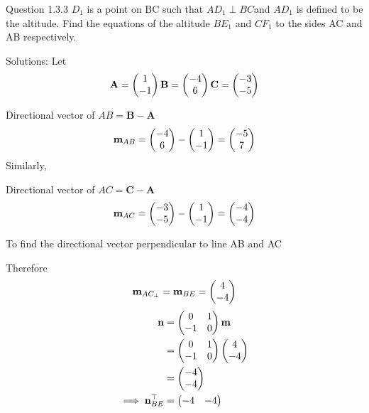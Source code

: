 \documentclass[12pt]{article}
\begin{document}
\let\vec\mathbf

Question 1.3.3 $D_{1}$ is a point on BC such that
$AD_{1}\perp BC$and $AD_{1} $ is defined to be the altitude.
Find the equations of the altitude $BE_{1} $ and $CF_{1}$
to the sides AC and AB respectively.






   
{Solutions}:
Let 
\begin{align}\vec{A}=\myvec{1\\-1\\}
\vec{B}=\myvec{-4 \\6 \\}
\vec{C}=\myvec{-3\\-5\\}
\end{align}


 Directional vector of $AB=\vec{B}-\vec{A}$
\begin{align}
\vec{m}_{AB}=\myvec{-4\\6\\}
-\myvec{1\\-1 \\}
=\myvec{-5\\7\\}
\end{align}
Similarly,


 Directional vector of $AC=\vec{C}-\vec{A}$
\begin{align}
\vec{m}_{AC}=\myvec{-3\\-5\\}
-\myvec{1\\-1\\}
=\myvec{-4\\-4\\}
\end{align}

To find the directional vector perpendicular to line AB and AC


Therefore
\begin{align}
\vec{m}_{AC_{\perp}}=\vec{m}_{BE}=\myvec{4\\-4}
\end{align}
\begin{align}
\vec{n} &= \myvec{0&1 \\ -1&0}\vec{m}\\
&= \myvec{0&1 \\ -1&0}\myvec{4 \\ -4}\\
&= \myvec{-4 \\ -4}\\
\implies \vec{n}_{BE}^{\top} &= \myvec{-4&-4}
\end{align}
\end{document}
